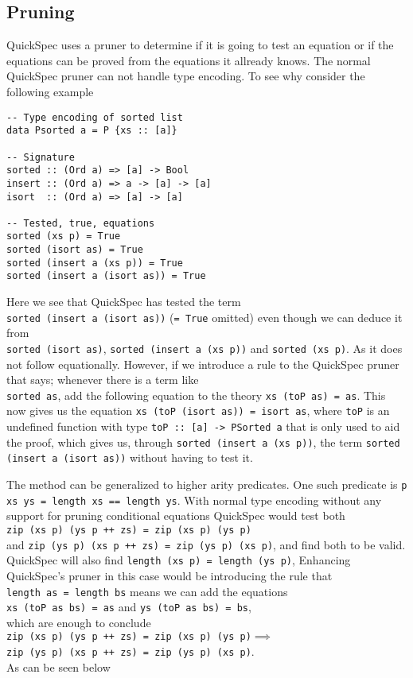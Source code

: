 \subsection{Pruning}
QuickSpec uses a pruner to determine if
it is going to test an equation or if the equations
can be proved from the equations it allready knows.
The normal QuickSpec pruner can not handle type encoding.
To see why consider the following example
\begin{verbatim}
-- Type encoding of sorted list
data Psorted a = P {xs :: [a]}

-- Signature
sorted :: (Ord a) => [a] -> Bool
insert :: (Ord a) => a -> [a] -> [a]
isort  :: (Ord a) => [a] -> [a]

-- Tested, true, equations
sorted (xs p) = True
sorted (isort as) = True
sorted (insert a (xs p)) = True
sorted (insert a (isort as)) = True
\end{verbatim}
Here we see that QuickSpec has tested the term
\\\texttt{sorted (insert a (isort as))} (\texttt{= True} omitted)
even though we can deduce it from
\\\texttt{sorted (isort as)},
\texttt{sorted (insert a (xs p))} and
\texttt{sorted (xs p)}. As it does not follow
equationally. However, if we introduce
a rule to the QuickSpec pruner that says;
whenever there is a term like \\\texttt{sorted as},
add the following equation to the theory
\texttt{xs (toP as) = as}. This now gives us
the equation \texttt{xs (toP (isort as)) = isort as},
where \texttt{toP} is an undefined function with type
\texttt{toP :: [a] -> PSorted a} that is only used to aid the proof,
which gives us, through \texttt{sorted (insert a (xs p))},
the term \texttt{sorted (insert a (isort as))} without
having to test it.

The method can be generalized to higher arity predicates.
One such predicate is \texttt{p xs ys = length xs == length ys}.
With normal type encoding without any support for pruning
conditional equations QuickSpec would test both
\\\texttt{zip (xs p) (ys p ++ zs) = zip (xs p) (ys p)}\\
and \texttt{zip (ys p) (xs p ++ zs) = zip (ys p) (xs p)}, and find
both to be valid.
QuickSpec will also find \texttt{length (xs p) = length (ys p)},
Enhancing QuickSpec's pruner in this case would be introducing
the rule that\\\texttt{length as = length bs} means we can add the equations
\\\texttt{xs (toP as bs) = as} and \texttt{ys (toP as bs) = bs},\\
which are enough to conclude\\
\texttt{zip (xs p) (ys p ++ zs) = zip (xs p) (ys p)}$\implies$
\\\texttt{zip (ys p) (xs p ++ zs) = zip (ys p) (xs p)}.\\As can be
seen below

